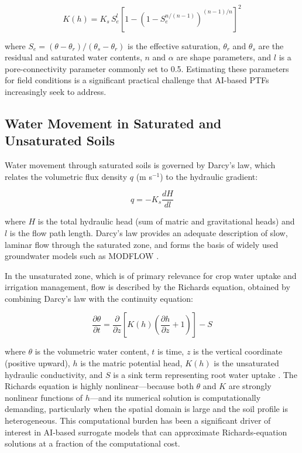 \documentclass[land,article,submit,pdftex,moreauthors]{Definitions/mdpi}
\numberwithin{equation}{section}
\begin{document}
\begin{equation}
K(h) = K_s \, S_e^{l} \left[1 - \left(1 - S_e^{n/(n-1)}\right)^{(n-1)/n}\right]^2
\end{equation}

\noindent where $S_e = (\theta - \theta_r)/(\theta_s - \theta_r)$ is the effective saturation, $\theta_r$ and $\theta_s$ are the residual and saturated water contents, $n$ and $\alpha$ are shape parameters, and $l$ is a pore-connectivity parameter commonly set to 0.5. Estimating these parameters for field conditions is a significant practical challenge that AI-based PTFs increasingly seek to address.

\subsection{Water Movement in Saturated and Unsaturated Soils}

Water movement through saturated soils is governed by Darcy's law, which relates the volumetric flux density $q$ (m s$^{-1}$) to the hydraulic gradient:

\begin{equation}
q = -K_s \frac{dH}{dl}
\end{equation}

\noindent where $H$ is the total hydraulic head (sum of matric and gravitational heads) and $l$ is the flow path length. Darcy's law provides an adequate description of slow, laminar flow through the saturated zone, and forms the basis of widely used groundwater models such as MODFLOW \citep{harbaugh2005modflow}.

In the unsaturated zone, which is of primary relevance for crop water uptake and irrigation management, flow is described by the Richards equation, obtained by combining Darcy's law with the continuity equation:

\begin{equation}
\frac{\partial \theta}{\partial t} = \frac{\partial}{\partial z}\left[K(h)\left(\frac{\partial h}{\partial z} + 1\right)\right] - S
\end{equation}

\noindent where $\theta$ is the volumetric water content, $t$ is time, $z$ is the vertical coordinate (positive upward), $h$ is the matric potential head, $K(h)$ is the unsaturated hydraulic conductivity, and $S$ is a sink term representing root water uptake \citep{richards1931capillary}. The Richards equation is highly nonlinear---because both $\theta$ and $K$ are strongly nonlinear functions of $h$---and its numerical solution is computationally demanding, particularly when the spatial domain is large and the soil profile is heterogeneous. This computational burden has been a significant driver of interest in AI-based surrogate models that can approximate Richards-equation solutions at a fraction of the computational cost.
\end{document}
